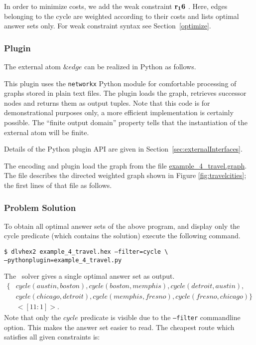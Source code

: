 \documentclass[a4paper, titlepage]{article}
\newcommand{\mi}[1]{\mathit{#1}}
\newcommand{\exampledownloadlink}[2]{\href{https://github.com/hexhex/manual/raw/master/#1}{#2}}
\newcommand\leftaligned[1]{\par \smallskip \noindent \qquad #1 \smallskip \par}
\newcommand{\row}[1]{%
  \ensuremath{\color{black}\ensuremath{\mathbf{#1}} \color{black}}%
}
\begin{document}
In order to minimize costs, we add the weak constraint
\row{r_16}.
Here, edges belonging to the cycle are weighted according 
to their costs and \dlvhex{} lists optimal answer sets only.
For weak constraint syntax see Section~\ref{optimize}.

\subsubsection{Plugin}
\label{sec:travelplugin}

The external atom $\&edge$ can be realized in Python as follows.



This plugin uses the {\tt networkx} Python module
for comfortable processing of graphs stored in plain text files.
%
The plugin loads the graph, retrieves successor nodes
and returns them as output tuples.
Note that this code is for demonstrational purposes only,
a more efficient implementation is certainly possible.
%
The \enquote{finite output domain} property tells
\dlvhex{} that the instantiation of the external atom will be finite.

Details of the Python plugin API
are given in Section~\ref{sec:externalInterfaces}.

The encoding and plugin load the graph from the file
\exampledownloadlink{example_4_travel/example_4_travel.graph}{example\_4\_travel.graph}.
The file describes the directed weighted graph
shown in Figure \ref{fig:travelcities};
the first lines of that file as follows.



\subsubsection{Problem Solution}

To obtain all optimal answer sets of the above program,
and display only the cycle predicate (which contains the solution)
execute the following command.

\leftaligned{\texttt{\$ dlvhex2 example\_4\_travel.hex --filter=cycle \textbackslash \\
\hphantom{\quad \$ dlvhex2 }--pythonplugin=example\_4\_travel.py}}

\noindent
The \dlvhex\ solver gives a single optimal answer set as output.
\begin{align*}
\{ & cycle(austin,boston), cycle(boston,memphis),cycle(detroit,austin), \\
   & cycle(chicago,detroit), cycle(memphis,fresno),cycle(fresno,chicago) \} \\
   & <[11:1]>.
\end{align*}
Note that only the $\mi{cycle}$ predicate is visible
due to the {\tt --filter} commandline option.
This makes the answer set easier to read.
The cheapest route which satisfies all given constraints is:
\smallskip
\end{document}
